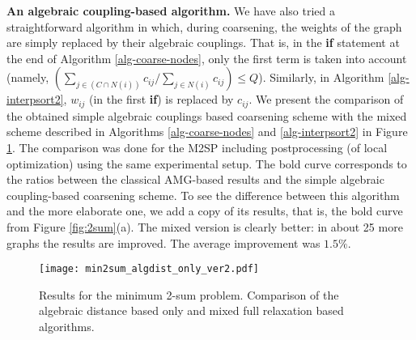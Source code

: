 \documentclass[final]{siamltex}
\begin{document}
\par {\bf An algebraic coupling-based algorithm.} We have also tried a straightforward algorithm in which, during coarsening, the weights of the graph are simply replaced by their algebraic couplings. That is, in the {\bf if} statement at the end of Algorithm \ref{alg-coarse-nodes}, only the first term is taken into account (namely,  $( \sum_{j\in (C \cap N(i))} c_{ij} / \sum_{j\in N(i)} c_{ij} )\leq Q$). Similarly, in Algorithm \ref{alg-interpsort2},
$w_{ij}$ (in the first {\bf if}) is replaced by $c_{ij}$.
We present the comparison of the obtained simple algebraic couplings based coarsening scheme with the mixed scheme described in Algorithms \ref{alg-coarse-nodes} and \ref{alg-interpsort2} in Figure \ref{fig:2sum-algdist-only}. The comparison was done for the M2SP including  postprocessing (of local optimization) using the same experimental setup. The bold curve corresponds to the ratios between the classical AMG-based results and the simple algebraic coupling-based coarsening scheme. To see the difference between this algorithm and the more elaborate one, we add a copy of its results, that is, the bold curve from Figure \ref{fig:2sum}(a). The mixed version is clearly better: in about 25 more graphs the results are improved. The average improvement was $1.5\%$.
\begin{figure}[h]
\centering
\texttt{[image: min2sum\_algdist\_only\_ver2.pdf]}\\
\caption{Results for the minimum 2-sum problem. Comparison of the algebraic distance based only and mixed full relaxation based algorithms.}\label{fig:2sum-algdist-only}
\end{figure}
\end{document}
